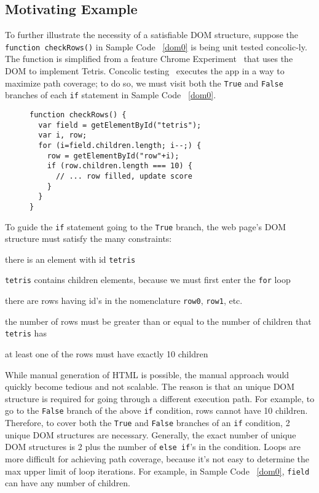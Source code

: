 \subsection{Motivating Example}
To further illustrate the necessity of a satisfiable DOM structure, suppose the {\tt function checkRows()} in Sample Code ~\ref{dom0} is being unit tested concolic-ly.  
The function is simplified from a feature Chrome Experiment~\cite{domtris} that uses the DOM to implement Tetris.  
Concolic testing~\cite{cute} executes the app in a way to maximize path coverage; to do so, we must visit both the {\tt True} and {\tt False} branches of each {\tt if} statement in Sample Code ~\ref{dom0}.
\begin{figure}
\begin{lstlisting}[caption=Example code whose tests and execution depend on the Document Object Model having a precise structure. {\tt getElementById()} is equivalent to {\tt document.getElementById()}.,label=dom0]
function checkRows() {
  var field = getElementById("tetris"); 
  var i, row;
  for (i=field.children.length; i--;) {
    row = getElementById("row"+i);
    if (row.children.length === 10) {
      // ... row filled, update score
    }
  }
}
\end{lstlisting}
\end{figure}

To guide the {\tt if} statement going to the {\tt True} branch, the web page's DOM structure must satisfy the many constraints:
\begin {compactitem}
\item there is an element with id {\tt tetris}
\item {\tt tetris} contains children elements, because we must first enter the {\tt for} loop
\item there are rows having id's in the nomenclature {\tt row0}, {\tt row1}, etc.
\item the number of rows must be greater than or equal to the number of children that {\tt tetris} has
\item at least one of the rows must have exactly 10 children
\end {compactitem}


While manual generation of HTML is possible, the manual approach would quickly become tedious and not scalable.  
The reason is that an unique DOM structure is required for going through a different execution path.
For example, to go to the {\tt False} branch of the above {\tt if} condition, rows cannot have 10 children.
Therefore, to cover both the {\tt True} and {\tt False} branches of an {\tt if} condition, 2 unique DOM structures are necessary.
Generally, the exact number of unique DOM structures is 2 plus the number of {\tt else if}'s in the condition.
Loops are more difficult for achieving path coverage, because it's not easy to determine the max upper limit of loop iterations.  For example, in Sample Code ~\ref{dom0}, {\tt field} can have any number of children.

